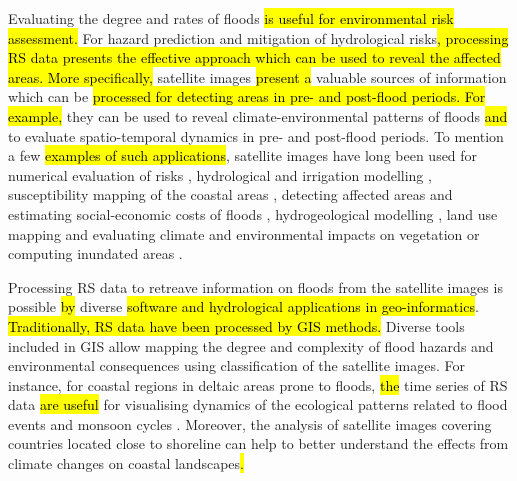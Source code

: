 \documentclass[water,article,submit,pdftex,moreauthors]{Definitions/mdpi}
\begin{document}
Evaluating the degree and rates of floods \hl{is useful for environmental risk assessment. }For hazard prediction and mitigation of hydrological risks\hl{, processing RS data presents the effective approach which can be used to reveal the affected areas. More specifically, }satellite images\hl{ present a} valuable sources of information which can be \hl{processed for detecting areas in pre- and post-flood periods. For example, }they can\hl{ }be used to reveal climate-environmental patterns of floods \hl{and} to evaluate spatio-temporal dynamics in pre- and post-flood periods. To mention a few \hl{examples of such applications}, satellite images have long been used for\hl{ }numerical evaluation of risks \citep{THAKUR2024130683}, hydrological and irrigation modelling \cite{SUN2024415}, susceptibility mapping of the coastal areas \cite{RAZAVITERMEH2023100595}, detecting affected areas and estimating social-economic costs of floods \cite{ZHENG2023101410,DUAN2024131010}, hydrogeological modelling \cite{BELL2021107451}, land use mapping and evaluating climate and environmental impacts on vegetation \cite{JARAMILLO2024526} or computing inundated areas \cite{ZUO2024}.

Processing RS data to retreave information on floods from the satellite images is possible \hl{by} diverse \hl{software and hydrological applications in geo-informatics}. \hl{Traditionally, RS data have been processed by GIS methods.} Diverse tools included in GIS allow mapping the degree and complexity of flood hazards and environmental consequences using classification of the satellite images. For instance, for coastal regions in deltaic areas prone to floods, \hl{the} time series of RS data \hl{are useful} for visualising dynamics of the ecological patterns related to flood events and monsoon cycles \citep{RAZAVITERMEH2023100595,SINGHA2023316,MATHEW2021100861}. Moreover, the analysis of satellite images covering countries located close to shoreline can help to better understand the effects from climate changes on coastal landscapes\hl{.}  
\end{document}
